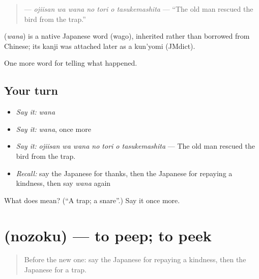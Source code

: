\begin{quote}
\textbf{   } — \emph{ojiisan wa wana no tori o tasukemashita} — \textquotedblleft{}The old man rescued the bird from the trap.\textquotedblright{}
\end{quote}

\begin{cousinweb}
\textbf{} (\emph{wana}) is a native Japanese word (wago), inherited rather than borrowed from Chinese; its kanji was attached later as a kun'yomi (JMdict).
\end{cousinweb}

\begin{grammarlens}[title={What you've built}]
One more word for telling what happened.
\end{grammarlens}

\subsection*{Your turn}
\begin{itemize}
\raggedright
  \item \emph{Say it:} \emph{wana}
  \item \emph{Say it:} \emph{wana}, once more
  \item \emph{Say it:} \emph{ojiisan wa wana no tori o tasukemashita} — The old man rescued the bird from the trap.
  \item \emph{Recall:} say the Japanese for thanks, then the Japanese for repaying a kindness, then say \emph{wana} again
\end{itemize}

\begin{tcolorbox}[breakable,colback=teal!4,colframe=teal!35!black,title={Before you move on}]
What does  mean? (\textquotedblleft{}A trap; a snare\textquotedblright{}.) Say it once more.
\end{tcolorbox}
\section[\texorpdfstring{\ja{のぞく} (nozoku)}{のぞく (nozoku)}]{ (nozoku) — to peep; to peek}

\label{lesson:JA-C304-nozoku}



\begin{quote}
Before the new one: say the Japanese for repaying a kindness, then the Japanese for a trap.
\end{quote}

